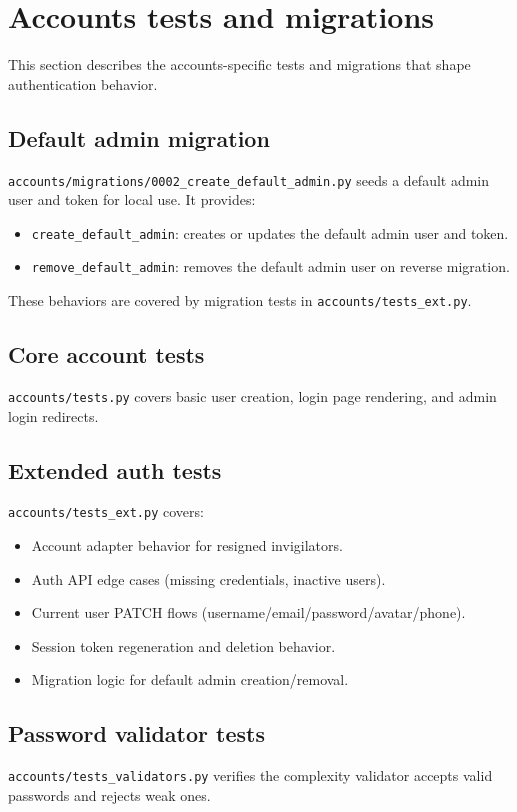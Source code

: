 \section{Accounts tests and migrations}
\label{sec:accounts:tests}

This section describes the accounts-specific tests and migrations that shape authentication behavior.

\subsection{Default admin migration}
\label{subsec:accounts:tests:migration}

\texttt{accounts/migrations/0002\_create\_default\_admin.py} seeds a default admin user and token for local use. It provides:

\begin{itemize}
  \item \texttt{create\_default\_admin}: creates or updates the default admin user and token.
  \item \texttt{remove\_default\_admin}: removes the default admin user on reverse migration.
\end{itemize}

These behaviors are covered by migration tests in \texttt{accounts/tests\_ext.py}.

\subsection{Core account tests}
\label{subsec:accounts:tests:core}

\texttt{accounts/tests.py} covers basic user creation, login page rendering, and admin login redirects.

\subsection{Extended auth tests}
\label{subsec:accounts:tests:ext}

\texttt{accounts/tests\_ext.py} covers:

\begin{itemize}
  \item Account adapter behavior for resigned invigilators.
  \item Auth API edge cases (missing credentials, inactive users).
  \item Current user PATCH flows (username/email/password/avatar/phone).
  \item Session token regeneration and deletion behavior.
  \item Migration logic for default admin creation/removal.
\end{itemize}

\subsection{Password validator tests}
\label{subsec:accounts:tests:validators}

\texttt{accounts/tests\_validators.py} verifies the complexity validator accepts valid passwords and rejects weak ones.

